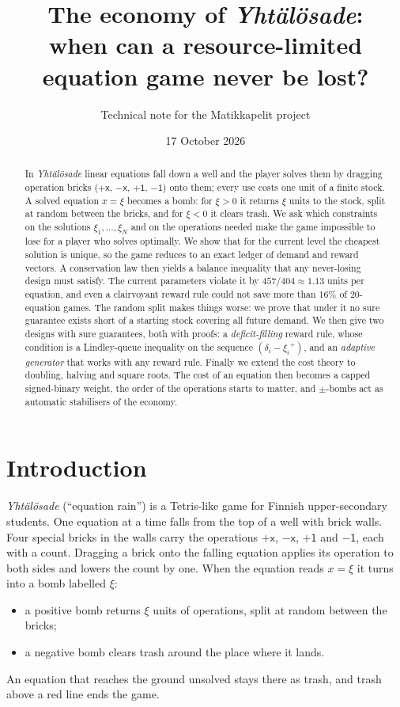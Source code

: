 \documentclass[11pt,a4paper]{article}
\title{The economy of \emph{Yhtälösade}:\\[2pt]
\large when can a resource-limited equation game never be lost?}
\author{Technical note for the Matikkapelit project}
\date{17 October 2026}
\theoremstyle{definition}
\theoremstyle{remark}
\newcommand{\pX}{\ensuremath{\mathord{+}\mathsf{x}}}
\newcommand{\mX}{\ensuremath{\mathord{-}\mathsf{x}}}
\newcommand{\pU}{\ensuremath{\mathord{+}\mathsf{1}}}
\newcommand{\mU}{\ensuremath{\mathord{-}\mathsf{1}}}
\newcommand{\pos}[1]{{#1}^{+}}
\begin{document}
\maketitle

\begin{abstract}
\noindent
In \emph{Yhtälösade} linear equations fall down a well and the player solves them by
dragging operation bricks ($\pX$, $\mX$, $\pU$, $\mU$) onto them; every use costs one unit
of a finite stock. A solved equation $x=\xi$ becomes a bomb: for $\xi>0$ it returns $\xi$
units to the stock, split at random between the bricks, and for $\xi<0$ it clears trash.
We ask which constraints on the solutions $\xi_1,\dots,\xi_N$ and on the operations
needed make the game impossible to lose for a player who solves optimally.
We show that for the current level the cheapest solution is unique, so the game reduces
to an exact ledger of demand and reward vectors.
A conservation law then yields a balance inequality that any never-losing design must
satisfy. The current parameters violate it by $457/404\approx1.13$ units per
equation, and even a clairvoyant reward rule could not save more than $16\%$ of
20-equation games. The random split makes things worse: we prove that under it no
sure guarantee exists short of a starting stock covering all future demand.
We then give two designs with sure guarantees, both with proofs:
a \emph{deficit-filling} reward rule, whose condition is a Lindley-queue inequality on
the sequence $(\delta_i-\pos{\xi_i})$, and an \emph{adaptive generator} that works
with any reward rule.
Finally we extend the cost theory to doubling, halving and square roots. The cost of
an equation then becomes a capped signed-binary weight, the order of the operations
starts to matter, and $\pm$-bombs act as automatic stabilisers of the economy.
\end{abstract}

\tableofcontents

\section{Introduction}\label{sec:intro}

\emph{Yhtälösade} (``equation rain'') is a Tetris-like game for Finnish upper-secondary
students. One equation at a time falls from the top of a well with brick walls. Four
special bricks in the walls carry the operations $\pX$, $\mX$, $\pU$ and $\mU$, each with
a count. Dragging a brick onto the falling equation applies its operation to both sides
and lowers the count by one. When the equation reads $x=\xi$ it turns into a bomb
labelled $\xi$:
\begin{itemize}[nosep]
\item a positive bomb returns $\xi$ units of operations, split at random between the bricks;
\item a negative bomb clears trash around the place where it lands.
\end{itemize}
An equation that reaches the ground unsolved stays there as trash, and trash above a red
line ends the game.
\end{document}
